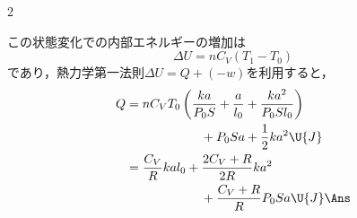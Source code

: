 \begin{multicols}{2}
\begin{komon}
\begin{chuu}
       \end{chuu}
 この状態変化での内部エネルギーの増加は
       \[\Delta U=nC_V(T_1-T_0)\]
       であり，熱力学第一法則$\Delta U=Q+(-w)$を利用すると，
       \[\begin{aligned}
         Q&=nC_VT_0\left(\frac{ka}{P_0S}+\frac{a}{l_0}+\frac{ka^2}{P_0Sl_0}\right)\\
          &\qquad\qquad\qquad+P_0Sa+\frac{1}{2}ka^2\U{J}\\
          &=\frac{C_V}{R}kal_0+\frac{2C_V+R}{2R}ka^2\\
          &\qquad\qquad\qquad+\frac{C_V+R}{R}P_0Sa\U{J}\Ans
       \end{aligned}\]
\end{komon}

\end{multicols}
